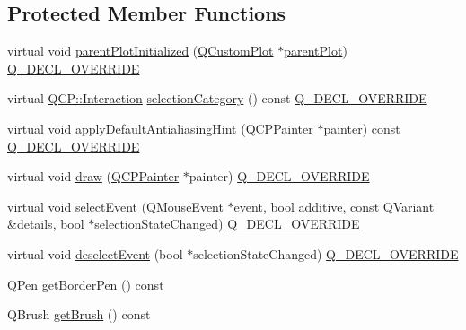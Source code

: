 \subsection*{Protected Member Functions}
\begin{DoxyCompactItemize}
\item 
virtual void \mbox{\hyperlink{class_q_c_p_legend_a2b225cefb5eb267771e2c7c44fd2b408}{parent\+Plot\+Initialized}} (\mbox{\hyperlink{class_q_custom_plot}{Q\+Custom\+Plot}} $\ast$\mbox{\hyperlink{class_q_c_p_layerable_a473edb813a4c1929d6b6a8fe3ff3faf7}{parent\+Plot}}) \mbox{\hyperlink{qcustomplot_8h_a42cc5eaeb25b85f8b52d2a4b94c56f55}{Q\+\_\+\+D\+E\+C\+L\+\_\+\+O\+V\+E\+R\+R\+I\+DE}}
\item 
virtual \mbox{\hyperlink{namespace_q_c_p_a2ad6bb6281c7c2d593d4277b44c2b037}{Q\+C\+P\+::\+Interaction}} \mbox{\hyperlink{class_q_c_p_legend_a1a2075e462984f9ff51d9c75bda3581b}{selection\+Category}} () const \mbox{\hyperlink{qcustomplot_8h_a42cc5eaeb25b85f8b52d2a4b94c56f55}{Q\+\_\+\+D\+E\+C\+L\+\_\+\+O\+V\+E\+R\+R\+I\+DE}}
\item 
virtual void \mbox{\hyperlink{class_q_c_p_legend_a817f75c234f82a2e26643dc0de742095}{apply\+Default\+Antialiasing\+Hint}} (\mbox{\hyperlink{class_q_c_p_painter}{Q\+C\+P\+Painter}} $\ast$painter) const \mbox{\hyperlink{qcustomplot_8h_a42cc5eaeb25b85f8b52d2a4b94c56f55}{Q\+\_\+\+D\+E\+C\+L\+\_\+\+O\+V\+E\+R\+R\+I\+DE}}
\item 
virtual void \mbox{\hyperlink{class_q_c_p_legend_a74f93358d2b4a76ec95c3a5d825582a3}{draw}} (\mbox{\hyperlink{class_q_c_p_painter}{Q\+C\+P\+Painter}} $\ast$painter) \mbox{\hyperlink{qcustomplot_8h_a42cc5eaeb25b85f8b52d2a4b94c56f55}{Q\+\_\+\+D\+E\+C\+L\+\_\+\+O\+V\+E\+R\+R\+I\+DE}}
\item 
virtual void \mbox{\hyperlink{class_q_c_p_legend_a71f54a05c3e5b1a1ade1864422cd642e}{select\+Event}} (Q\+Mouse\+Event $\ast$event, bool additive, const Q\+Variant \&details, bool $\ast$selection\+State\+Changed) \mbox{\hyperlink{qcustomplot_8h_a42cc5eaeb25b85f8b52d2a4b94c56f55}{Q\+\_\+\+D\+E\+C\+L\+\_\+\+O\+V\+E\+R\+R\+I\+DE}}
\item 
virtual void \mbox{\hyperlink{class_q_c_p_legend_ac2066837f7ebc32a5b15434cdca5b176}{deselect\+Event}} (bool $\ast$selection\+State\+Changed) \mbox{\hyperlink{qcustomplot_8h_a42cc5eaeb25b85f8b52d2a4b94c56f55}{Q\+\_\+\+D\+E\+C\+L\+\_\+\+O\+V\+E\+R\+R\+I\+DE}}
\item 
Q\+Pen \mbox{\hyperlink{class_q_c_p_legend_a1cf9df6f2130c5ad842dc92188ab6bd7}{get\+Border\+Pen}} () const
\item 
Q\+Brush \mbox{\hyperlink{class_q_c_p_legend_ab1438d5d67304cdda3b9339da580d6bc}{get\+Brush}} () const
\end{DoxyCompactItemize}
